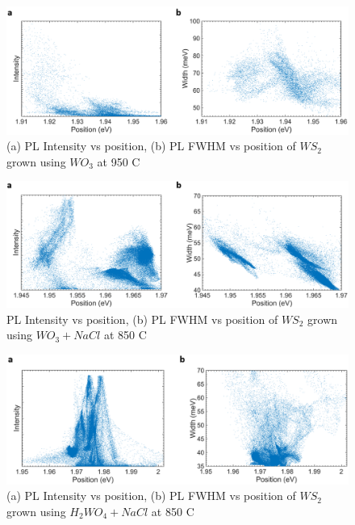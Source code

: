 \documentclass[12pt]{article}
\begin{document}
\begin{figure}[h]
\begin{center}
\includegraphics[scale=0.3]{PaperSIScatterWO3.png}
\caption{(a) PL Intensity vs position, (b) PL FWHM vs position of $WS_2$ grown using $WO_3$ at 950 {\degree}C}
\label{fig:PaperSIScatterWO3}
\end{center}
\end{figure}

\begin{figure}[h]
\begin{center}
\includegraphics[scale=0.3]{PaperSIScatterWO3NaCl.png}
\caption{PL Intensity vs position, (b) PL FWHM vs position of $WS_2$ grown using $WO_3+NaCl$ at 850 {\degree}C}
\label{fig:PaperSIScatterWO3NaCl}
\end{center}
\end{figure}

\begin{figure}[h]
\begin{center}
\includegraphics[scale=0.3]{PaperSIScatterH2WO4NaCl.png}
\caption{(a) PL Intensity vs position, (b) PL FWHM vs position of $WS_2$ grown using $H_2WO_4+NaCl$ at 850 {\degree}C}
\label{fig:PaperSIScatterH2WO4NaCl}
\end{center}
\end{figure}
\end{document}
